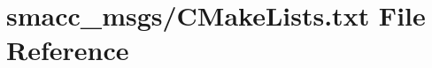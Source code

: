 \hypertarget{smacc__msgs_2CMakeLists_8txt}{}\section{smacc\+\_\+msgs/\+C\+Make\+Lists.txt File Reference}
\label{smacc__msgs_2CMakeLists_8txt}
